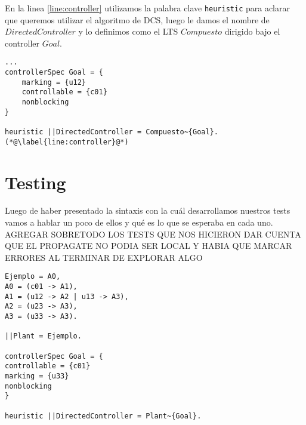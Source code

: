 En la linea \ref{line:controller} utilizamos la palabra clave \texttt{heuristic} para aclarar que queremos utilizar el algoritmo de DCS, luego le damos el nombre de $DirectedController$ y lo definimos como el LTS $Compuesto$ dirigido bajo el controller $Goal$.

\begin{lstlisting}[language = mtsa, caption=Ejemplo de Controller y DCS, label=ejController]
...
controllerSpec Goal = {
    marking = {u12}
    controllable = {c01}
    nonblocking
}

heuristic ||DirectedController = Compuesto~{Goal}. (*@\label{line:controller}@*)
\end{lstlisting}


\section{Testing}
Luego de haber presentado la sintaxis con la cuál desarrollamos nuestros tests vamos a hablar un poco de ellos y qué es lo que se esperaba en cada uno. AGREGAR SOBRETODO LOS TESTS QUE NOS HICIERON DAR CUENTA QUE EL PROPAGATE NO PODIA SER LOCAL Y HABIA QUE MARCAR ERRORES AL TERMINAR DE EXPLORAR ALGO

\begin{lstlisting}[language = mtsa, caption=Ejemplo de test]
Ejemplo = A0,
A0 = (c01 -> A1),
A1 = (u12 -> A2 | u13 -> A3),
A2 = (u23 -> A3),
A3 = (u33 -> A3).

||Plant = Ejemplo.

controllerSpec Goal = {
controllable = {c01}
marking = {u33}
nonblocking
}

heuristic ||DirectedController = Plant~{Goal}.
\end{lstlisting}
